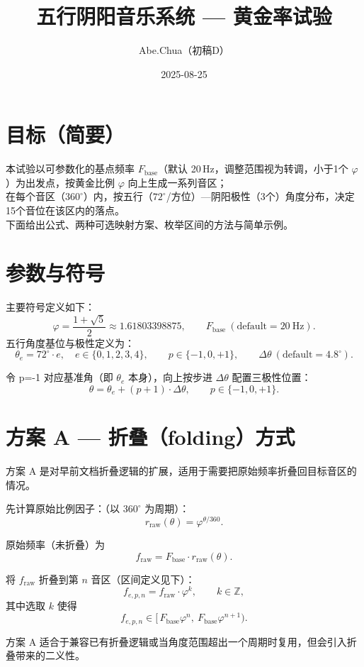 \documentclass{article}
\title{五行阴阳音乐系统 — 黄金率试验}
\author{Abe.Chua（初稿D）}
\date{2025-08-25}
\begin{document}
\maketitle

\section*{目标（简要）}
本试验以可参数化的基点频率 \(F_{\mathrm{base}}\)（默认 20\,Hz，调整范围视为转调，小于1个 \(\varphi\)）为出发点，按黄金比例 \(\varphi\) 向上生成一系列音区；
\\在每个音区（$360^\circ$）内，按五行（$72^\circ$/方位）—阴阳极性（3个）角度分布，决定15个音位在该区内的落点。
\\下面给出公式、两种可选映射方案、枚举区间的方法与简单示例。

\section*{参数与符号}
主要符号定义如下：
\[
\varphi=\frac{1+\sqrt5}{2}\approx1.61803398875,\qquad F_{\mathrm{base}}\ (\text{default}=20\ \mathrm{Hz}).
\]
五行角度基位与极性定义为：
\[
\theta_e = 72^\circ\cdot e,\quad e\in\{0,1,2,3,4\},\qquad p\in\{-1,0,+1\},\qquad \Delta\theta\ (\text{default}=4.8^\circ).
\]

令 p=-1 对应基准角（即 \(\theta_e\) 本身），向上按步进 \(\Delta\theta\) 配置三极性位置：
\[
\theta=\theta_e + (p+1)\cdot\Delta\theta,\qquad p\in\{-1,0,+1\}.
\]

\section*{方案 A — 折叠（folding）方式}
方案 A 是对早前文档折叠逻辑的扩展，适用于需要把原始频率折叠回目标音区的情况。

先计算原始比例因子：（以 $360^\circ$ 为周期）：
\[
r_{\mathrm{raw}}(\theta)=\varphi^{\theta/360}.
\]

原始频率（未折叠）为
\[
f_{\mathrm{raw}} = F_{\mathrm{base}}\cdot r_{\mathrm{raw}}(\theta).
\]

将 \(f_{\mathrm{raw}}\) 折叠到第 \(n\) 音区（区间定义见下）：
\[
f_{e,p,n} = f_{\mathrm{raw}}\cdot\varphi^{k},\qquad k\in\mathbb{Z},
\]
其中选取 \(k\) 使得
\[
f_{e,p,n}\in[\,F_{\mathrm{base}}\varphi^{n},\ F_{\mathrm{base}}\varphi^{n+1}).
\]

方案 A 适合于兼容已有折叠逻辑或当角度范围超出一个周期时复用，但会引入折叠带来的二义性。
\end{document}
